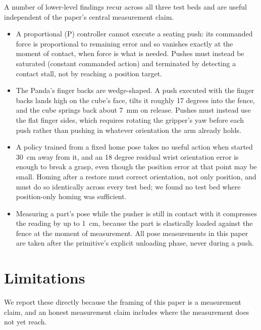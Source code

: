 \documentclass[11pt]{article}
\begin{document}
A number of lower-level findings recur across all three test beds and are
useful independent of the paper's central measurement claim.

\begin{itemize}
  \item A proportional (P) controller cannot execute a seating push: its
  commanded force is proportional to remaining error and so vanishes
  exactly at the moment of contact, when force is what is needed. Pushes
  must instead be saturated (constant commanded action) and terminated by
  detecting a contact stall, not by reaching a position target.
  \item The Panda's finger backs are wedge-shaped. A push executed with the
  finger backs lands high on the cube's face, tilts it roughly 17 degrees
  into the fence, and the cube springs back about 7~mm on release. Pushes
  must instead use the flat finger sides, which requires rotating the
  gripper's yaw before each push rather than pushing in whatever orientation
  the arm already holds.
  \item A policy trained from a fixed home pose takes no useful action when
  started 30~cm away from it, and an 18 degree residual wrist orientation
  error is enough to break a grasp, even though the position error at that
  point may be small. Homing after a restore must correct orientation, not
  only position, and must do so identically across every test bed; we
  found no test bed where position-only homing was sufficient.
  \item Measuring a part's pose while the pusher is still in contact with
  it compresses the reading by up to 1~cm, because the part is elastically
  loaded against the fence at the moment of measurement. All pose
  measurements in this paper are taken after the primitive's explicit
  unloading phase, never during a push.
\end{itemize}

\section{Limitations}
\label{sec:limitations}

We report these directly because the framing of this paper is a
measurement claim, and an honest measurement claim includes where the
measurement does not yet reach.
\end{document}
